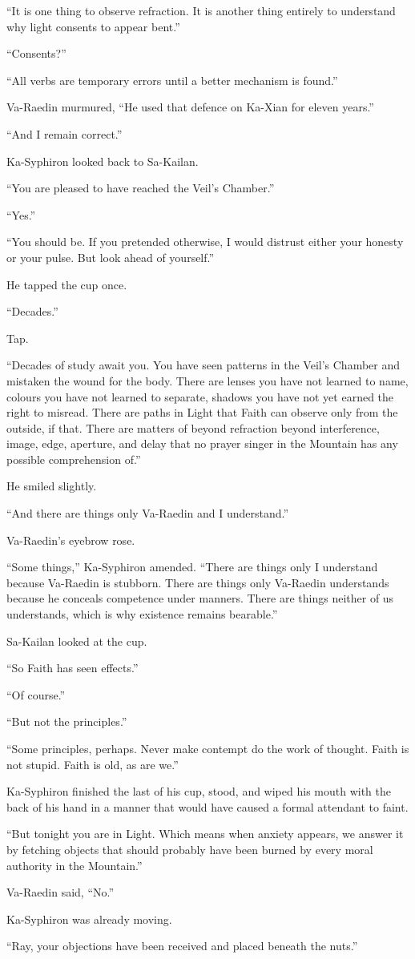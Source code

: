 “It is one thing to observe refraction. It is another thing entirely to understand why light consents to appear bent.”\par
“Consents?”\par
“All verbs are temporary errors until a better mechanism is found.”\par
Va-Raedin murmured, “He used that defence on Ka-Xian for eleven years.”\par
“And I remain correct.”\par
Ka-Syphiron looked back to Sa-Kailan.\par
“You are pleased to have reached the Veil’s Chamber.”\par
“Yes.”\par
“You should be. If you pretended otherwise, I would distrust either your honesty or your pulse. But look ahead of yourself.”\par
He tapped the cup once.\par
“Decades.”\par
Tap.\par
“Decades of study await you. You have seen patterns in the Veil’s Chamber and mistaken the wound for the body. 
There are lenses you have not learned to name, colours you have not learned to separate, shadows you have not yet earned the right to misread. 
There are paths in Light that Faith can observe only from the outside, if that. There are matters of beyond refraction beyond interference, image, edge, aperture, and delay that no prayer singer in the Mountain has any possible comprehension of.”\par
He smiled slightly.\par
“And there are things only Va-Raedin and I understand.”\par
Va-Raedin’s eyebrow rose.\par
“Some things,” Ka-Syphiron amended. “There are things only I understand because Va-Raedin is stubborn. 
There are things only Va-Raedin understands because he conceals competence under manners. 
There are things neither of us understands, which is why existence remains bearable.”\par
Sa-Kailan looked at the cup.\par
“So Faith has seen effects.”\par
“Of course.”\par
“But not the principles.”\par
“Some principles, perhaps. Never make contempt do the work of thought. Faith is not stupid. Faith is old, as are we.”\par
Ka-Syphiron finished the last of his cup, stood, and wiped his mouth with the back of his hand in a manner that would have caused a formal attendant to faint.\par
“But tonight you are in Light. Which means when anxiety appears, we answer it by fetching objects that should probably have been burned by every moral authority in the Mountain.”\par
Va-Raedin said, “No.”\par
Ka-Syphiron was already moving.\par
“Ray, your objections have been received and placed beneath the nuts.”\par


